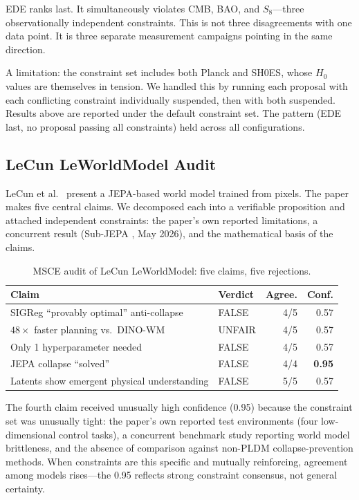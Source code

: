 \documentclass[11pt,a4paper]{article}
\begin{document}
EDE ranks last. It simultaneously violates CMB, BAO, and $S_8$---three observationally independent constraints. This is not three disagreements with one data point. It is three separate measurement campaigns pointing in the same direction.

A limitation: the constraint set includes both Planck and SH0ES, whose $H_0$ values are themselves in tension. We handled this by running each proposal with each conflicting constraint individually suspended, then with both suspended. Results above are reported under the default constraint set. The pattern (EDE last, no proposal passing all constraints) held across all configurations.

\subsection{LeCun LeWorldModel Audit}

LeCun et al.\ \cite{lecun2026} present a JEPA-based world model trained from pixels. The paper makes five central claims. We decomposed each into a verifiable proposition and attached independent constraints: the paper's own reported limitations, a concurrent result (Sub-JEPA \cite{subjepa2026}, May 2026), and the mathematical basis of the claims.

\begin{table}[ht]
\centering
\caption{MSCE audit of LeCun LeWorldModel: five claims, five rejections.}
\label{tab:lecun}
\begin{tabular}{>{\raggedright\arraybackslash}p{5cm}lrr}
\toprule
\textbf{Claim} & \textbf{Verdict} & \textbf{Agree.} & \textbf{Conf.} \\
\midrule
SIGReg ``provably optimal'' anti-collapse & FALSE & 4/5 & 0.57 \\
$48\times$ faster planning vs.\ DINO-WM & UNFAIR & 4/5 & 0.57 \\
Only 1 hyperparameter needed & FALSE & 4/5 & 0.57 \\
JEPA collapse ``solved'' & FALSE & 4/4 & \textbf{0.95} \\
Latents show emergent physical understanding & FALSE & 5/5 & 0.57 \\
\bottomrule
\end{tabular}
\end{table}

The fourth claim received unusually high confidence (0.95) because the constraint set was unusually tight: the paper's own reported test environments (four low-dimensional control tasks), a concurrent benchmark study reporting world model brittleness, and the absence of comparison against non-PLDM collapse-prevention methods. When constraints are this specific and mutually reinforcing, agreement among models rises---the 0.95 reflects strong constraint consensus, not general certainty.
\end{document}
